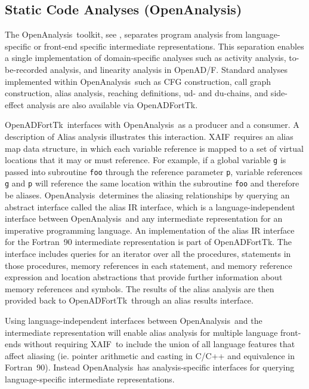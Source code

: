 \documentclass{book}
\newcommand{\OpenADF}{OpenAD/F}
\newcommand{\OpenADFortTk}{OpenADFortTk}
\newcommand{\OpenAnalysis}{OpenAnalysis}
\newcommand{\xaif}{XAIF}
\begin{document}
\subsection{Static Code Analyses (\OpenAnalysis)} \label{sec:openanalysis}

The \OpenAnalysis\ toolkit, see \cite{oaWeb}, separates program
analysis from language-specific or front-end specific intermediate
representations.  This separation enables a single implementation of
domain-specific analyses such as activity analysis, to-be-recorded
analysis, and linearity analysis in \OpenADF.  Standard analyses
implemented within \OpenAnalysis\ such as CFG construction, call graph
construction, alias analysis, reaching definitions, ud- and du-chains,
and side-effect analysis are also available via
\OpenADFortTk.

\OpenADFortTk\ interfaces with \OpenAnalysis\ as a producer and a
consumer.  A description of Alias analysis illustrates this
interaction.  \xaif\ requires an alias map data structure, in which
each variable reference is mapped to a set of virtual locations that
it may or must reference.  For example, if a global variable \lstinline{g}
is passed into subroutine \lstinline{foo} through the reference parameter
\lstinline{p}, variable references \lstinline{g} and \lstinline{p} will reference the
same location within the subroutine \lstinline{foo} and therefore be aliases.  
\OpenAnalysis\ determines the aliasing relationships by querying an
abstract interface called the alias IR interface, which is a 
language-independent interface between \OpenAnalysis\ and any
intermediate representation for an imperative programming language.  
An implementation of the alias IR interface for the Fortran~90
intermediate representation is part of
\OpenADFortTk.  The interface includes queries for an iterator over
all the procedures, statements in those procedures, memory references
in each statement, and memory reference expression and location
abstractions that provide further information about memory references
and symbols.  The results of the alias analysis are then provided back
to \OpenADFortTk\ through an alias results interface.

Using language-independent interfaces between \OpenAnalysis\ and the
intermediate representation will enable alias analysis for multiple
language front-ends without requiring \xaif\ to include the union of
all language features that affect aliasing (ie. pointer arithmetic and
casting in C/C++ and equivalence in Fortran~90).  Instead
\OpenAnalysis\ has analysis-specific interfaces for querying
language-specific intermediate representations.
\end{document}
